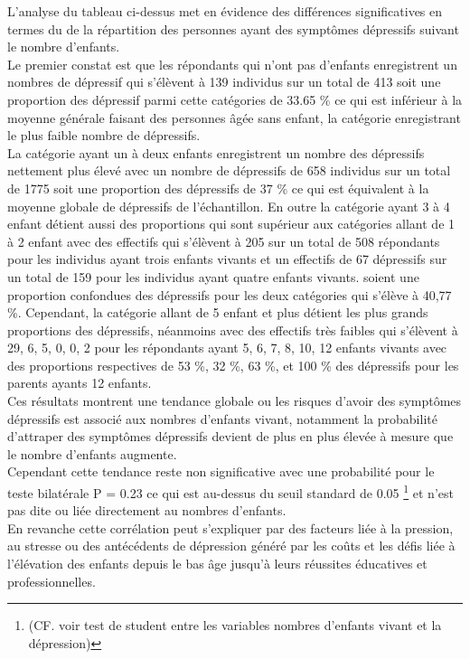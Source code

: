 \documentclass[a4paper]{article}
\begin{document}
L’analyse du  tableau ci-dessus met en évidence  des différences significatives en termes du de la répartition des personnes ayant des symptômes dépressifs suivant le nombre d’enfants.\\
Le premier constat est que les répondants qui n’ont pas d’enfants enregistrent un nombres de dépressif qui s'élèvent à 139 individus sur un total de 413 soit une proportion des dépressif parmi cette catégories de 33.65 \% ce qui est inférieur à la moyenne générale faisant des personnes âgée sans enfant, la catégorie enregistrant le plus faible nombre de dépressifs.\\
La catégorie ayant un à deux enfants enregistrent un nombre des dépressifs nettement plus élevé avec un nombre de dépressifs de 658 individus sur un total de 1775 soit une proportion des dépressifs de 37 \%  ce qui est équivalent à la moyenne globale de dépressifs de l'échantillon.
En outre la catégorie ayant 3 à 4 enfant détient aussi des proportions qui sont supérieur aux catégories  allant de 1 à 2 enfant avec des effectifs qui s'élèvent à 205 sur un total de 508 répondants pour les individus ayant trois enfants vivants et un effectifs de 67 dépressifs sur un total de 159 pour les individus ayant quatre enfants vivants. soient une proportion confondues des dépressifs pour les deux catégories qui s’élève à 40,77 \%. 
Cependant, la catégorie allant de 5 enfant et plus détient les plus grands proportions des dépressifs, néanmoins avec des effectifs très faibles qui s’élèvent à 29, 6, 5, 0, 0, 2  pour les répondants ayant  5, 6, 7, 8, 10, 12 enfants vivants avec des proportions respectives de 53 \%, 32 \%, 63 \%,  et 100 \% des dépressifs pour les parents ayants 12 enfants.\\
Ces résultats montrent une tendance globale ou les risques d’avoir des symptômes dépressifs est associé  aux nombres d’enfants vivant, notamment la probabilité d’attraper des symptômes dépressifs devient de plus en plus élevée  à mesure que le nombre d’enfants augmente.\\
 Cependant cette tendance reste non significative avec une probabilité pour le teste bilatérale  P = 0.23 ce qui est au-dessus du seuil standard de 0.05 \footnote{(CF. voir test de student entre les variables nombres d’enfants vivant et la dépression)}  et n’est pas dite ou liée directement au nombres d’enfants.\\
En revanche cette corrélation peut s'expliquer par des facteurs liée à la pression, au stresse ou des antécédents de dépression généré par  les coûts et les défis liée à l'élévation des enfants depuis le bas âge jusqu'à leurs réussites éducatives et professionnelles. \\ 
\end{document}
